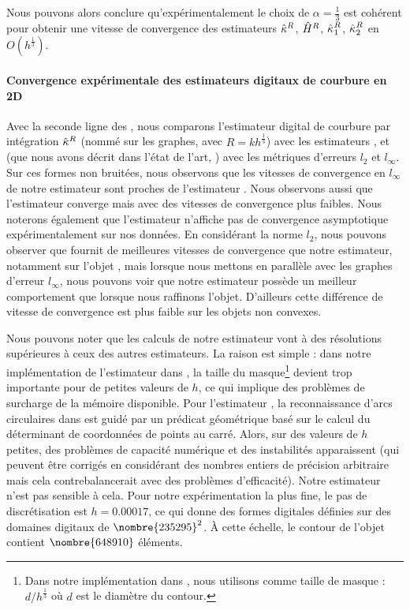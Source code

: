 \noindent Nous pouvons alors conclure qu'expérimentalement le choix de $\alpha =
\frac{1}{3}$ est cohérent pour obtenir une vitesse de convergence des
estimateurs $\hat{\kappa}^{R}$, $\hat{H}^{R}$, $\hat{\kappa_{}}_{1}^{R}$,
$\hat{\kappa_{}}_{2}^{R}$ en $O(h^\frac{1}{3})$.
%
\paragraph{Convergence expérimentale des estimateurs digitaux de courbure en 2D}
%
Avec la seconde ligne des
,
nous comparons l'estimateur digital de courbure par intégration $\hat{\kappa}^{R}$
(nommé \II sur les graphes, avec $R = kh^\frac{1}{3}$) avec les estimateurs \BC
\cite{Esbelin2011}, \MDSS \cite{Coeurjolly2001,deVieilleville2007} et \MDCA
\cite{Roussillon2011} (que nous avons décrit dans l'état de l'art,
) avec les métriques d'erreurs $l_2$ et
$l_\infty$. Sur ces formes non bruitées, nous observons que les vitesses de
convergence en $l_\infty$ de notre estimateur sont proches de l'estimateur \MDCA.
Nous observons aussi que l'estimateur \BC converge mais avec des vitesses de
convergence plus faibles. Nous noterons également que l'estimateur \MDSS
n'affiche pas de convergence asymptotique expérimentalement sur nos données. En
considérant la norme $l_2$, nous pouvons observer que \BC fournit de meilleures
vitesses de convergence que notre estimateur, notamment sur l'objet \Ellipse,
mais lorsque nous mettons en parallèle avec les graphes d'erreur $l_\infty$,
nous pouvons voir que notre estimateur possède un meilleur comportement que \BC
lorsque nous raffinons l'objet. D'ailleurs cette différence de vitesse de
convergence est plus faible sur les objets non convexes.


Nous pouvons noter que les calculs de notre estimateur vont à des résolutions
supérieures à ceux des autres estimateurs. La raison est simple :
dans notre implémentation de l'estimateur \BC dans \DGtal, la taille du
masque\footnote{Dans notre implémentation dans \DGtal, nous utilisons comme
taille de masque : $d / h^\frac{1}{3}$ où $d$ est le diamètre du contour.}
devient trop importante pour de petites valeurs de $h$, ce qui implique des
problèmes de surcharge de la mémoire disponible. Pour l'estimateur \MDCA, la
reconnaissance d'arcs circulaires dans \DGtal est guidé par un prédicat
géométrique basé sur le calcul du déterminant de coordonnées de points au carré.
Alors, sur des valeurs de $h$ petites, des problèmes de capacité numérique et
des instabilités apparaissent (qui peuvent être corrigés en considérant des
nombres entiers de précision arbitraire mais cela contrebalancerait avec des
problèmes d'efficacité). Notre estimateur n'est pas sensible à cela. Pour notre
expérimentation la plus fine, le pas de discrétisation est $h = 0.00017$, ce qui
donne des formes digitales définies sur des domaines digitaux de
$\nombre{235295}^2$. À cette échelle, le contour de l'objet \Ellipse contient
$\nombre{648910}$ éléments.


